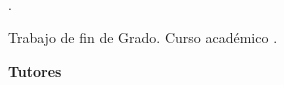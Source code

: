 

\thispagestyle{empty}

\begin{center}
  \large  



  \begingroup
  \huge{\miTitulo} \\ \bigskip
  \endgroup

  \textrm{\miNombre}


\end{center}  

\newpage
\thispagestyle{empty}

\hfill

\vfill

\noindent\miNombre \textit{\miTitulo}.

Trabajo de fin de Grado. Curso académico \miCurso.

\begin{minipage}[t]{0.15\textwidth}
  \textbf{Tutores}
\end{minipage}
\begin{minipage}[t]{0.55\textwidth}
  \flushleft
  \miTutor
\end{minipage}
\begin{minipage}[t]{0.30\textwidth}
  \flushright
  \miGrado 
  \medskip

  \miFacultad
  \medskip

  \miUniversidad
\end{minipage}
\begin{flushleft}
\end{flushleft}

\endinput
